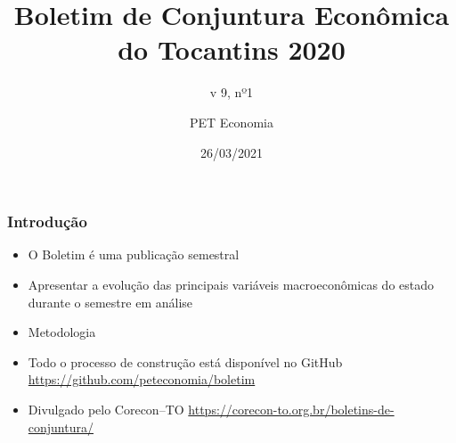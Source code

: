 \documentclass[12pt,aspectratio=169]{beamer}
\title{Boletim de Conjuntura Econômica do Tocantins 2020}
\subtitle{v 9, nº1}
\author{PET Economia}
\institute{Universidade Federal do Tocantins}
\date{26/03/2021}
\begin{document}
\begin{frame}
    \titlepage
\end{frame}


\begin{frame}  
\frametitle{Introdução}
\begin{itemize}
\item O Boletim é uma publicação semestral
\item Apresentar a evolução das principais variáveis macroeconômicas do estado durante o semestre em análise
\item Metodologia
\item Todo o processo de construção está disponível no GitHub \url{https://github.com/peteconomia/boletim}
\item Divulgado pelo Corecon--TO \url{https://corecon-to.org.br/boletins-de-conjuntura/}

\end{itemize}
\end{frame}
\end{document}
